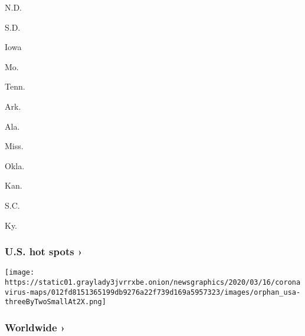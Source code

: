\href{https://www.nytimes3xbfgragh.onion/interactive/2020/us/north-dakota-coronavirus-cases.html}{}

N.D.
\href{https://www.nytimes3xbfgragh.onion/interactive/2020/us/south-dakota-coronavirus-cases.html}{}

S.D.
\href{https://www.nytimes3xbfgragh.onion/interactive/2020/us/iowa-coronavirus-cases.html}{}

Iowa
\href{https://www.nytimes3xbfgragh.onion/interactive/2020/us/missouri-coronavirus-cases.html}{}

Mo.
\href{https://www.nytimes3xbfgragh.onion/interactive/2020/us/tennessee-coronavirus-cases.html}{}

Tenn.
\href{https://www.nytimes3xbfgragh.onion/interactive/2020/us/arkansas-coronavirus-cases.html}{}

Ark.
\href{https://www.nytimes3xbfgragh.onion/interactive/2020/us/alabama-coronavirus-cases.html}{}

Ala.
\href{https://www.nytimes3xbfgragh.onion/interactive/2020/us/mississippi-coronavirus-cases.html}{}

Miss.
\href{https://www.nytimes3xbfgragh.onion/interactive/2020/us/oklahoma-coronavirus-cases.html}{}

Okla.
\href{https://www.nytimes3xbfgragh.onion/interactive/2020/us/kansas-coronavirus-cases.html}{}

Kan.
\href{https://www.nytimes3xbfgragh.onion/interactive/2020/us/south-carolina-coronavirus-cases.html}{}

S.C.
\href{https://www.nytimes3xbfgragh.onion/interactive/2020/us/kentucky-coronavirus-cases.html}{}

Ky.

\href{https://www.nytimes3xbfgragh.onion/interactive/2020/us/coronavirus-us-cases.html}{}

\hypertarget{us-hot-spots-}{%
\subsubsection{U.S. hot spots ›}\label{us-hot-spots-}}

\texttt{[image: https://static01.graylady3jvrrxbe.onion/newsgraphics/2020/03/16/coronavirus-maps/012fd8151365199db9276a22f739d169a5957323/images/orphan\_usa-threeByTwoSmallAt2X.png]}
\href{https://www.nytimes3xbfgragh.onion/interactive/2020/world/coronavirus-maps.html}{}

\hypertarget{worldwide-}{%
\subsubsection{Worldwide ›}\label{worldwide-}}

